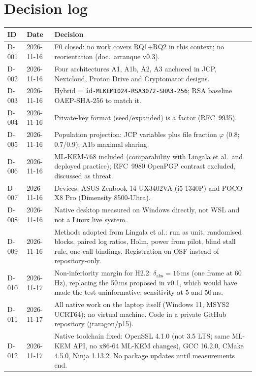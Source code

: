 \documentclass[11pt,a4paper]{article}
\begin{document}
\section{Decision log}\label{sec:log}
\begin{longtable}{l l p{11.5cm}}
\toprule
\textbf{ID} & \textbf{Date} & \textbf{Decision}\\
\midrule
D-001 & 2026-11-16 & F0 closed: no work covers RQ1+RQ2 in this context; no reorientation (doc.\ arranque v0.3).\\
D-002 & 2026-11-16 & Four architectures A1, A1b, A2, A3 anchored in JCP, Nextcloud, Proton Drive and Cryptomator designs.\\
D-003 & 2026-11-16 & Hybrid = \texttt{id-MLKEM1024-RSA3072-SHA3-256}; RSA baseline OAEP-SHA-256 to match it.\\
D-004 & 2026-11-16 & Private-key format (seed/expanded) is a factor (RFC~9935).\\
D-005 & 2026-11-16 & Population projection: JCP variables plus file fraction $\varphi$ (0.8; 0.7/0.9); A1b maximal sharing.\\
D-006 & 2026-11-16 & ML-KEM-768 included (comparability with Lingala et al.\ and deployed practice); RFC~9980 OpenPGP contrast excluded, discussed as threat.\\
D-007 & 2026-11-16 & Devices: ASUS Zenbook 14 UX3402VA (i5-1340P) and POCO X8 Pro (Dimensity 8500-Ultra).\\
D-008 & 2026-11-16 & Native desktop measured on Windows directly, not WSL and not a Linux live system.\\
D-009 & 2026-11-16 & Methods adopted from Lingala et al.: run as unit, randomised blocks, paired log ratios, Holm, power from pilot, blind stall rule, one-call bindings. Registration on OSF instead of repository-only.\\
D-010 & 2026-11-17 & Non-inferiority margin for H2.2: $\delta_{\mathrm{abs}} = 16$\,ms (one frame at 60\,Hz), replacing the 50\,ms proposed in v0.1, which would have made the test uninformative; sensitivity at 5 and 50\,ms.\\
D-011 & 2026-11-17 & All native work on the laptop itself (Windows 11, MSYS2 UCRT64); no virtual machine. Code in a private GitHub repository (jraragon/p15).\\
D-012 & 2026-11-17 & Native toolchain fixed: OpenSSL 4.1.0 (not 3.5 LTS; same ML-KEM API, no x86-64 ML-KEM changes), GCC 16.2.0, CMake 4.5.0, Ninja 1.13.2. No package updates until measurements end.\\

\end{longtable}
\end{document}
